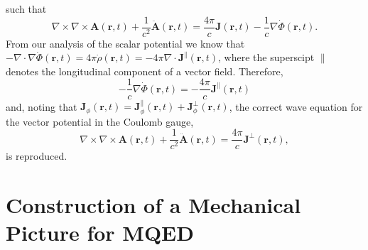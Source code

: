 \documentclass{article}
\begin{document}
such that
\begin{equation}
\nabla\times\nabla\times\mathbf{A}(\mathbf{r},t) + \frac{1}{c^2}\ddot{\mathbf{A}}(\mathbf{r},t) = \frac{4\pi}{c}\mathbf{J}(\mathbf{r},t) - \frac{1}{c}\nabla\dot{\Phi}(\mathbf{r},t).
\end{equation}
From our analysis of the scalar potential we know that $-\nabla\cdot\nabla\dot{\Phi}(\mathbf{r},t) = 4\pi\dot{\rho}(\mathbf{r},t) = -4\pi\nabla\cdot\mathbf{J}^\parallel(\mathbf{r},t)$, where the superscipt $\parallel$ denotes the longitudinal component of a vector field. Therefore,
\begin{equation}
-\frac{1}{c}\nabla\dot{\Phi}(\mathbf{r},t) = -\frac{4\pi}{c}\mathbf{J}^\parallel(\mathbf{r},t)
\end{equation}
and, noting that $\mathbf{J}_\phi(\mathbf{r},t) = \mathbf{J}_\phi^\parallel(\mathbf{r},t) + \mathbf{J}_\phi^\perp(\mathbf{r},t)$, the correct wave equation for the vector potential in the Coulomb gauge,
\begin{equation}\label{eq:vectorPotentialWaveEq}
\nabla\times\nabla\times\mathbf{A}(\mathbf{r},t) + \frac{1}{c^2}\ddot{\mathbf{A}}(\mathbf{r},t) = \frac{4\pi}{c}\mathbf{J}^\perp(\mathbf{r},t),
\end{equation}
is reproduced.



















\section{Construction of a Mechanical Picture for MQED}
\end{document}
